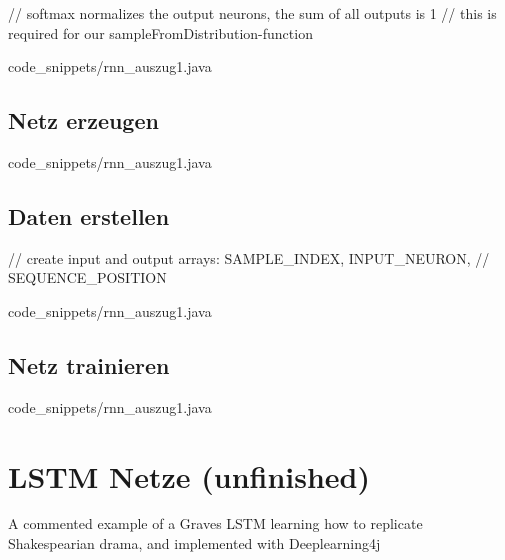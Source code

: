 {    // softmax normalizes the output neurons, the sum of all outputs is 1
    // this is required for our sampleFromDistribution-function


{code_snippets/rnn_auszug1.java}

\subsection{Netz erzeugen}

{code_snippets/rnn_auszug1.java}

\subsection{Daten erstellen}
// create input and output arrays: SAMPLE\_INDEX, INPUT\_NEURON,
    // SEQUENCE\_POSITION

{code_snippets/rnn_auszug1.java}

\subsection{Netz trainieren}

{code_snippets/rnn_auszug1.java}

\section{LSTM Netze (unfinished)}
A commented example of a Graves LSTM learning how to replicate Shakespearian drama, and implemented with Deeplearning4j
}
